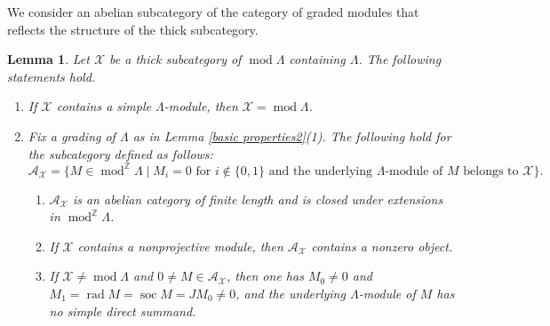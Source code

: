 \documentclass{amsart}
\newtheorem{lem}[thm]{Lemma}
\theoremstyle{definition}
\theoremstyle{remark}
\numberwithin{equation}{thm}
\def\A{\mathcal{A}}
\def\gmod{\operatorname{mod}^{\mathbb{Z}}\!}
\def\L{\Lambda}
\def\mod{\operatorname{mod}}
\def\rad{\operatorname{rad}}
\def\soc{\operatorname{soc}}
\def\X{\mathcal{X}}
\begin{document}
We consider an abelian subcategory of the category of graded modules that reflects the structure of the thick subcategory.

\begin{lem}\label{thick to abelian}
Let $\X$ be a thick subcategory of $\mod\L$ containing $\L$.
The following statements hold.
\begin{enumerate}[{\rm (1)}]
\item If $\X$ contains a simple $\L$-module, then $\X=\mod\L$.
\item Fix a grading of $\L$ as in Lemma \ref{basic properties2}(1). The following hold for the subcategory defined as follows:
$$
\A_\X=\{M\in\gmod\L\mid M_i=0\text{ for }i\notin\{0,1\}\text{ and the underlying $\L$-module of $M$ belongs to $\X$}\}.
$$
\begin{enumerate}[{\rm (i)}]
\item $\A_\X$ is an abelian category of finite length and is closed under extensions in $\gmod\L$.
\item If $\X$ contains a nonprojective module, then $\A_\X$ contains a nonzero object.
\item If $\X\ne\mod\L$ and $0\ne M\in\A_\X$, then one has $M_0\ne0$ and $M_1=\rad M=\soc M=JM_0\ne0$, and the underlying $\L$-module of $M$ has no simple direct summand.
\end{enumerate}
\end{enumerate}
\end{lem}
\end{document}
